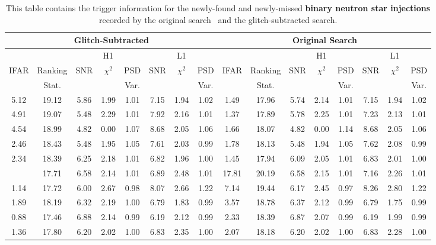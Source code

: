 \begin{landscape}
\begin{table}[tb]
\centering
\caption{\label{tab:apdx_changed_snr_bns}This table contains the trigger information for the newly-found and newly-missed \textbf{binary neutron star injections} recorded by the original search~\cite{gwtc3} and the glitch-subtracted search.} 
\begin{tabular}{|c|c|c|c|c|c|c|c||c|c|c|c|c|c|c|c|}
\hline
\multicolumn{8}{|c||}{Glitch-Subtracted} & \multicolumn{8}{c|}{Original Search} \\
\hline
\multicolumn{2}{|c|}{} & \multicolumn{3}{c|}{H1} & \multicolumn{3}{c||}{L1} & \multicolumn{2}{c|}{} & \multicolumn{3}{c|}{H1} & \multicolumn{3}{c|}{L1}\\
\hline
IFAR & Ranking & SNR & $\chi^{2}$ & PSD & SNR & $\chi^{2}$ & PSD & IFAR & Ranking & SNR & $\chi^{2}$ & PSD & SNR & $\chi^{2}$ & PSD \\ &
Stat. & & & Var. & & & Var. & & Stat. & & & Var. & & & Var.\\
\hline
5.12 & 19.12 & 5.86 & 1.99 & 1.01 & 7.15 & 1.94 & 1.02 & 1.49 & 17.96 & 5.74 & 2.14 & 1.01 & 7.15 & 1.94 & 1.02 \\
4.91 & 19.07 & 5.48 & 2.29 & 1.01 & 7.92 & 2.16 & 1.01 & 1.37 & 17.89 & 5.78 & 2.25 & 1.01 & 7.23 & 2.13 & 1.01 \\
4.54 & 18.99 & 4.82 & 0.00 & 1.07 & 8.68 & 2.05 & 1.06 & 1.66 & 18.07 & 4.82 & 0.00 & 1.14 & 8.68 & 2.05 & 1.06 \\
2.46 & 18.43 & 5.48 & 1.95 & 1.05 & 7.61 & 2.03 & 0.99 & 1.78 & 18.13 & 5.48 & 1.94 & 1.05 & 7.62 & 2.08 & 0.99 \\
2.34 & 18.39 & 6.25 & 2.18 & 1.01 & 6.82 & 1.96 & 1.00 & 1.45 & 17.94 & 6.09 & 2.05 & 1.01 & 6.83 & 2.01 & 1.00 \\
\hdashline
1.24 & 17.71 & 6.58 & 2.14 & 1.01 & 6.89 & 2.48 & 1.01 & 17.81 & 20.19 & 6.58 & 2.15 & 1.01 & 7.16 & 2.26 & 1.01 \\
1.14 & 17.72 & 6.00 & 2.67 & 0.98 & 8.07 & 2.66 & 1.22 & 7.14 & 19.44 & 6.17 & 2.45 & 0.97 & 8.26 & 2.80 & 1.22 \\
1.89 & 18.19 & 6.32 & 2.19 & 1.00 & 6.79 & 1.83 & 0.99 & 3.57 & 18.78 & 6.37 & 2.12 & 0.99 & 6.79 & 1.75 & 0.99 \\
0.88 & 17.46 & 6.88 & 2.14 & 0.99 & 6.19 & 2.12 & 0.99 & 2.33 & 18.39 & 6.87 & 2.07 & 0.99 & 6.19 & 1.99 & 0.99 \\
1.36 & 17.80 & 6.20 & 2.02 & 1.00 & 6.83 & 2.35 & 1.00 & 2.07 & 18.18 & 6.20 & 2.02 & 1.00 & 6.83 & 2.28 & 1.00 \\
\hline
\end{tabular}
\end{table}
\end{landscape}
\restoregeometry %

